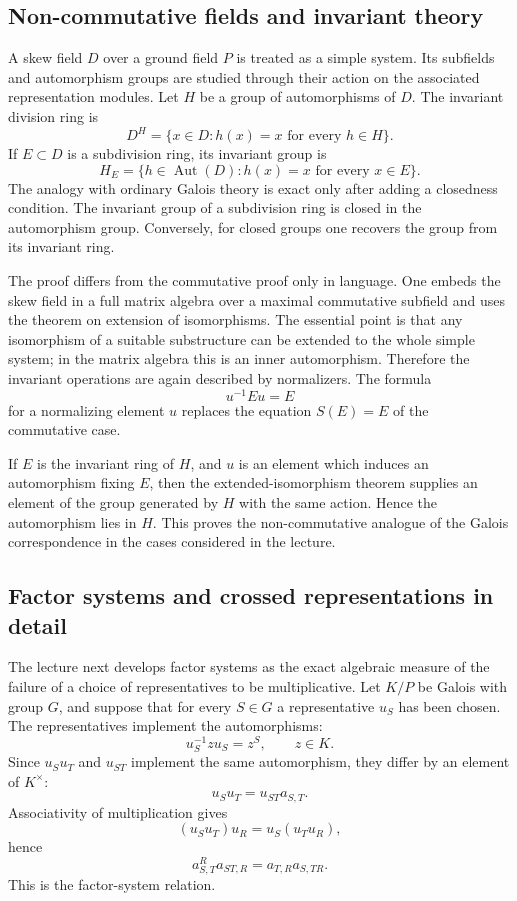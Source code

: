 \documentclass[11pt]{article}
\begin{document}
\subsection{Non-commutative fields and invariant theory}

A skew field \(D\) over a ground field \(P\) is treated as a simple system. Its subfields and automorphism groups are studied through their action on the associated representation modules. Let \(H\) be a group of automorphisms of \(D\). The invariant division ring is
\[
  D^H=\{x\in D: h(x)=x\text{ for every }h\in H\}.
\]
If \(E\subset D\) is a subdivision ring, its invariant group is
\[
  H_E=\{h\in\operatorname{Aut}(D):h(x)=x\text{ for every }x\in E\}.
\]
The analogy with ordinary Galois theory is exact only after adding a closedness condition. The invariant group of a subdivision ring is closed in the automorphism group. Conversely, for closed groups one recovers the group from its invariant ring.

The proof differs from the commutative proof only in language. One embeds the skew field in a full matrix algebra over a maximal commutative subfield and uses the theorem on extension of isomorphisms. The essential point is that any isomorphism of a suitable substructure can be extended to the whole simple system; in the matrix algebra this is an inner automorphism. Therefore the invariant operations are again described by normalizers. The formula
\[
  u^{-1}Eu=E
\]
for a normalizing element \(u\) replaces the equation \(S(E)=E\) of the commutative case.

If \(E\) is the invariant ring of \(H\), and \(u\) is an element which induces an automorphism fixing \(E\), then the extended-isomorphism theorem supplies an element of the group generated by \(H\) with the same action. Hence the automorphism lies in \(H\). This proves the non-commutative analogue of the Galois correspondence in the cases considered in the lecture.

\subsection{Factor systems and crossed representations in detail}

The lecture next develops factor systems as the exact algebraic measure of the failure of a choice of representatives to be multiplicative. Let \(K/P\) be Galois with group \(G\), and suppose that for every \(S\in G\) a representative \(u_S\) has been chosen. The representatives implement the automorphisms:
\[
  u_S^{-1} z u_S=z^S,
  \qquad z\in K.
\]
Since \(u_Su_T\) and \(u_{ST}\) implement the same automorphism, they differ by an element of \(K^{\times}\):
\[
  u_Su_T=u_{ST}a_{S,T}.
\]
Associativity of multiplication gives
\[
  (u_Su_T)u_R=u_S(u_Tu_R),
\]
hence
\[
  a_{S,T}^{R}a_{ST,R}=a_{T,R}a_{S,TR}.
\]
This is the factor-system relation.
\end{document}
